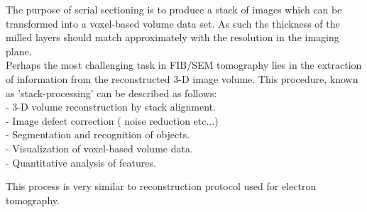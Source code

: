 The purpose of serial sectioning is to produce a stack of images which can be transformed into a voxel-based volume data set. As such the thickness of the milled layers should match approximately with the resolution in the imaging plane.\\
Perhaps the most challenging task in FIB/SEM tomography lies in the extraction of information from the reconstructed 3-D image volume. This procedure, known as 'stack-processing' can be described as follows:\\
\indent - 3-D volume reconstruction by stack alignment.\\
\indent - Image defect correction ( noise reduction etc...)\\
\indent - Segmentation and recognition of objects.\\
\indent - Visualization of voxel-based volume data.\\
\indent - Quantitative analysis of features.

This process is very similar to reconstruction protocol used for electron tomography.



